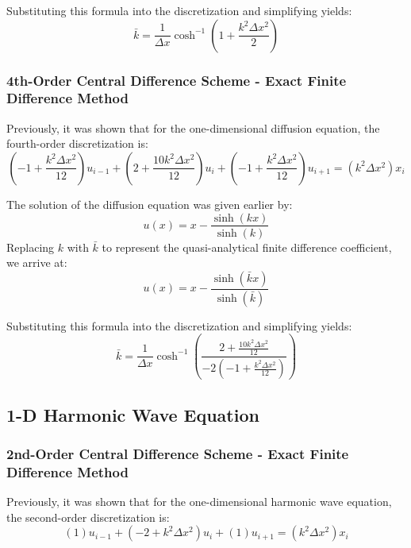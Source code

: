 \documentclass[10pt]{article}		%
\numberwithin{equation}{section}
\begin{document}
Substituting this formula into the discretization and simplifying yields:
\begin{equation}
\bar{k} = \frac{1}{\Delta x} \cosh^{-1}\left(1+\frac{k^2\Delta x^2}{2}\right)
\end{equation}

\subsubsection{4th-Order Central Difference Scheme - Exact Finite Difference Method}

Previously, it was shown that for the one-dimensional diffusion equation, the fourth-order discretization is:
\begin{equation}
\left(-1 + \frac{k^2\Delta x^2}{12}\right) u_{i-1} + \left(2 + \frac{10 k^2\Delta x^2}{12}\right) u_{i} + \left(-1+ \frac{k^2\Delta x^2}{12}\right) u_{i+1} = \left(k^2\Delta x^2 \right)x_i
\end{equation}

The solution of the diffusion equation was given earlier by:
\begin{equation}
u(x) = x - \frac{\sinh(kx)}{\sinh(k)}
\end{equation}
Replacing $k$ with $\bar{k}$ to represent the quasi-analytical finite difference coefficient, we arrive at:
\begin{equation}
u(x) = x - \frac{\sinh(\bar{k}x)}{\sinh(\bar{k})}
\end{equation}

Substituting this formula into the discretization and simplifying yields:
\begin{equation}
\bar{k} = \frac{1}{\Delta x} \cosh^{-1}\left(\frac{2+\frac{10k^2\Delta x^2}{12}}{-2\left(-1+\frac{k^2\Delta x^2}{12}\right)}\right)
\end{equation}

\newpage

\subsection{1-D Harmonic Wave Equation}

\subsubsection{2nd-Order Central Difference Scheme - Exact Finite Difference Method}

Previously, it was shown that for the one-dimensional harmonic wave equation, the second-order discretization is:
\begin{equation}
\left(1\right) u_{i-1} + \left(-2 + k^2\Delta x^2\right) u_{i} + \left(1\right) u_{i+1} = \left(k^2\Delta x^2 \right)x_i
\end{equation}
\end{document}
